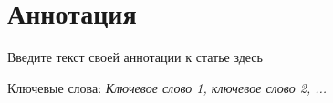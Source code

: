 
    \section*{Аннотация}
    \par
    Введите текст своей аннотации к статье здесь   
\begin{flushleft}
Ключевые слова: \emph{ Ключевое слово 1, ключевое слово 2, ...}
 
\end{flushleft}
